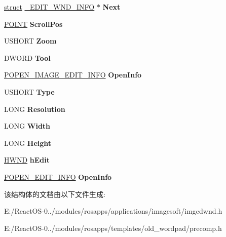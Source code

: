 \begin{DoxyCompactItemize}
\item 
\mbox{\label{struct___e_d_i_t___w_n_d___i_n_f_o_a157d4b76e1e0e6a06d7060ccf5b17e4b}} 
\hyperlink{interfacestruct}{struct} \hyperlink{struct___e_d_i_t___w_n_d___i_n_f_o}{\+\_\+\+E\+D\+I\+T\+\_\+\+W\+N\+D\+\_\+\+I\+N\+FO} $\ast$ {\bfseries Next}
\item 
\mbox{\label{struct___e_d_i_t___w_n_d___i_n_f_o_aa2afca90fd300110d3678034dddecf16}} 
\hyperlink{structtag_p_o_i_n_t}{P\+O\+I\+NT} {\bfseries Scroll\+Pos}
\item 
\mbox{\label{struct___e_d_i_t___w_n_d___i_n_f_o_a290c9ec1cad430e188a7b1b790175fa2}} 
U\+S\+H\+O\+RT {\bfseries Zoom}
\item 
\mbox{\label{struct___e_d_i_t___w_n_d___i_n_f_o_a847c6fed7ec8f010f3afad6600377713}} 
D\+W\+O\+RD {\bfseries Tool}
\item 
\mbox{\label{struct___e_d_i_t___w_n_d___i_n_f_o_a1d95d882bfb50ba3671b113851d8792a}} 
\hyperlink{struct___o_p_e_n___i_m_a_g_e___e_d_i_t___i_n_f_o}{P\+O\+P\+E\+N\+\_\+\+I\+M\+A\+G\+E\+\_\+\+E\+D\+I\+T\+\_\+\+I\+N\+FO} {\bfseries Open\+Info}
\item 
\mbox{\label{struct___e_d_i_t___w_n_d___i_n_f_o_aaaca9bc0ef260f51260ba38040c45103}} 
U\+S\+H\+O\+RT {\bfseries Type}
\item 
\mbox{\label{struct___e_d_i_t___w_n_d___i_n_f_o_a6633da41adb66a720723d598f1352c14}} 
L\+O\+NG {\bfseries Resolution}
\item 
\mbox{\label{struct___e_d_i_t___w_n_d___i_n_f_o_a3bff0ca8ae09cd80305758fb2e1346a3}} 
L\+O\+NG {\bfseries Width}
\item 
\mbox{\label{struct___e_d_i_t___w_n_d___i_n_f_o_a911c94cdc735ab38a2b64ffa82f54c89}} 
L\+O\+NG {\bfseries Height}
\item 
\mbox{\label{struct___e_d_i_t___w_n_d___i_n_f_o_ab3a77dffda103df99f2ee0be14c2e3f7}} 
\hyperlink{interfacevoid}{H\+W\+ND} {\bfseries h\+Edit}
\item 
\mbox{\label{struct___e_d_i_t___w_n_d___i_n_f_o_ac40fb4eadb1fb2c2b9f9e42b24eb04ce}} 
\hyperlink{struct___o_p_e_n___e_d_i_t___i_n_f_o}{P\+O\+P\+E\+N\+\_\+\+E\+D\+I\+T\+\_\+\+I\+N\+FO} {\bfseries Open\+Info}
\end{DoxyCompactItemize}


该结构体的文档由以下文件生成\+:\begin{DoxyCompactItemize}
\item 
E\+:/\+React\+O\+S-\/0../modules/rosapps/applications/imagesoft/imgedwnd.\+h\item 
E\+:/\+React\+O\+S-\/0../modules/rosapps/templates/old\+\_\+wordpad/precomp.\+h\end{DoxyCompactItemize}
